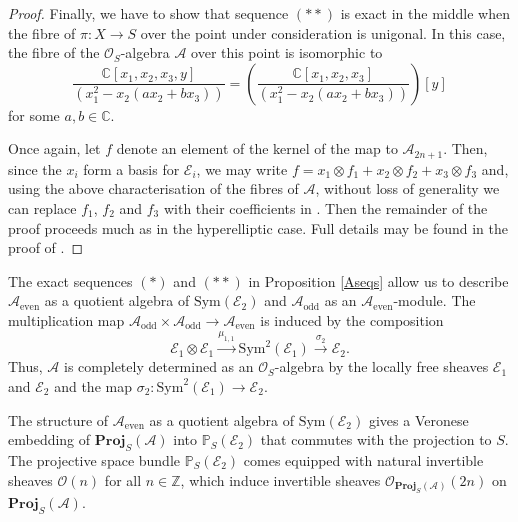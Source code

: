 \documentclass{amsart}
\begin{document}
\begin{proof}
Finally, we have to show that sequence $(**)$ is exact in the middle when the fibre of $\pi\colon X \to S$ over the point under consideration is unigonal. In this case, the fibre of the ${\mathcal{O}}_S$-algebra ${\mathcal{A}}$ over this point is isomorphic to 
\[\frac{{\mathbb{C}}[x_1,x_2,x_3,y]}{(x_1^2 - x_2(ax_2 + bx_3))} = \left(\frac{{\mathbb{C}}[x_1,x_2,x_3]}{(x_1^2 - x_2(ax_2 + bx_3))}\right)[y]\]
for some $a,b \in {\mathbb{C}}$.

Once again, let $f$ denote an element of the kernel of the map to ${\mathcal{A}}_{2n+1}$. Then, since the $x_i$ form a basis for ${\mathcal{E}}_i$, we may write $f = x_1 \otimes f_1 + x_2 \otimes f_2 + x_3 \otimes f_3$ and, using the above characterisation of the fibres of ${\mathcal{A}}$, without loss of generality we can replace $f_1$, $f_2$ and $f_3$ with their coefficients in . Then the remainder of the proof proceeds much as in the hyperelliptic case. Full details may be found in the proof of \cite[Proposition 4.2.4]{mythesis}.  \end{proof}

The exact sequences $(*)$ and $(**)$ in Proposition \ref{Aseqs} allow us to describe ${\mathcal{A}}_{\mathrm{even}}$ as a quotient algebra of ${\mathrm{Sym}}({\mathcal{E}}_2)$ and ${\mathcal{A}}_{\mathrm{odd}}$ as an ${\mathcal{A}}_{\mathrm{even}}$-module. The multiplication map ${\mathcal{A}}_{\mathrm{odd}} \times {\mathcal{A}}_{\mathrm{odd}} \to {\mathcal{A}}_{\mathrm{even}}$ is induced by the composition
\[ {\mathcal{E}}_1 \otimes {\mathcal{E}}_1 \stackrel{\mu_{1,1}}{\longrightarrow} {\mathrm{Sym}}^2({\mathcal{E}}_1) \stackrel{\sigma_2}{\longrightarrow} {\mathcal{E}}_2.\] 
Thus, ${\mathcal{A}}$ is completely determined as an ${\mathcal{O}}_S$-algebra by the locally free sheaves ${\mathcal{E}}_1$ and ${\mathcal{E}}_2$ and the map $\sigma_2\colon {\mathrm{Sym}}^2({\mathcal{E}}_1) \to {\mathcal{E}}_2$. 

The structure of ${\mathcal{A}}_{\mathrm{even}}$ as a quotient algebra of ${\mathrm{Sym}}({\mathcal{E}}_2)$ gives a Veronese embedding of $\mathbf{Proj}_S({\mathcal{A}})$ into ${\mathbb{P}}_S({\mathcal{E}}_2)$ that commutes with the projection to $S$. The projective space bundle ${\mathbb{P}}_S({\mathcal{E}}_2)$ comes equipped with natural invertible sheaves ${\mathcal{O}}(n)$ for all $n \in {\mathbb{Z}}$, which induce invertible sheaves ${\mathcal{O}}_{\mathbf{Proj}_S({\mathcal{A}})}(2n)$ on $\mathbf{Proj}_S({\mathcal{A}})$.
\end{document}
